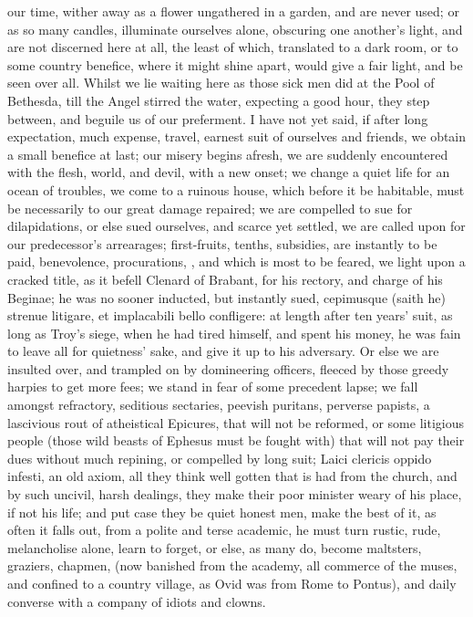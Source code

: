 {our time, wither away as a flower ungathered in a garden, and are never
used; or as so many candles, illuminate ourselves alone, obscuring one
another's light, and are not discerned here at all, the least of which,
translated to a dark room, or to some country benefice, where it might
shine apart, would give a fair light, and be seen over all. Whilst we
lie waiting here as those sick men did at the Pool of  Bethesda,
till the Angel stirred the water, expecting a good hour, they step
between, and beguile us of our preferment. I have not yet said, if
after long expectation, much expense, travel, earnest suit of ourselves
and friends, we obtain a small benefice at last; our misery begins
afresh, we are suddenly encountered with the flesh, world, and devil,
with a new onset; we change a quiet life for an ocean of troubles, we
come to a ruinous house, which before it be habitable, must be
necessarily to our great damage repaired; we are compelled to sue for
dilapidations, or else sued ourselves, and scarce yet settled, we are
called upon for our predecessor's arrearages; first-fruits, tenths,
subsidies, are instantly to be paid, benevolence, procurations, \etc{},
and which is most to be feared, we light upon a cracked title, as it
befell Clenard of Brabant, for his rectory, and charge of his Beginae;
he was no sooner inducted, but instantly sued, cepimusque (saith
he) strenue litigare, et implacabili bello confligere: at length after
ten years' suit, as long as Troy's siege, when he had tired himself,
and spent his money, he was fain to leave all for quietness' sake, and
give it up to his adversary. Or else we are insulted over, and trampled
on by domineering officers, fleeced by those greedy harpies to get more
fees; we stand in fear of some precedent lapse; we fall amongst
refractory, seditious sectaries, peevish puritans, perverse papists, a
lascivious rout of atheistical Epicures, that will not be reformed, or
some litigious people (those wild beasts of Ephesus must be fought
with) that will not pay their dues without much repining, or compelled
by long suit; Laici clericis oppido infesti, an old axiom, all they
think well gotten that is had from the church, and by such uncivil,
harsh dealings, they make their poor minister weary of his place, if
not his life; and put case they be quiet honest men, make the best of
it, as often it falls out, from a polite and terse academic, he must
turn rustic, rude, melancholise alone, learn to forget, or else, as
many do, become maltsters, graziers, chapmen, \etc{} (now banished from
the academy, all commerce of the muses, and confined to a country
village, as Ovid was from Rome to Pontus), and daily converse with a
company of idiots and clowns.

}
